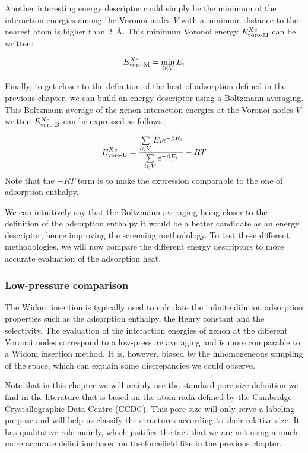 \documentclass[main]{subfiles}
\begin{document}
Another interesting energy descriptor could simply be the minimum of the interaction energies among the Voronoi nodes $V$ with a minimum distance to the nearest atom is higher than \SI{2}{\angstrom}. This minimum Voronoi energy $E_{\text{voro-M}}^{Xe}$ can be written: 

\begin{equation}
    E_{\text{voro-M}}^{Xe} = \min_{i \in V} E_i
\end{equation}

Finally, to get closer to the definition of the heat of adsorption defined in the previous chapter, we can build an energy descriptor using a Boltzmann averaging. This Boltzmann average of the xenon interaction energies at the Voronoi nodes $V$ written $E_{\text{voro-B}}^{Xe}$ can be expressed as follows:

\begin{equation}
    E_{\text{voro-B}}^{Xe} = \dfrac{\sum\limits_{i \in V} E_i e^{-\beta E_i}}{\sum\limits_{i \in V} e^{-\beta E_i}} -RT
\end{equation}
Note that the $-RT$ term is to make the expression comparable to the one of adsorption enthalpy. 

We can intuitively say that the Boltzmann averaging being closer to the definition of the adsorption enthalpy it would be a better candidate as an energy descriptor, hence improving the screening methodology. To test these different methodologies, we will now compare the different energy descriptors to more accurate evaluation of the adsorption heat. 

\subsubsection{Low-pressure comparison}

The Widom insertion is typically used to calculate the infinite dilution adsorption properties such as the adsorption enthalpy, the Henry constant and the selectivity. The evaluation of the interaction energies of xenon at the different Voronoi nodes correspond to a low-pressure averaging and is more comparable to a Widom insertion method. It is, however, biased by the inhomogeneous sampling of the space, which can explain some discrepancies we could observe.

Note that in this chapter we will mainly use the standard pore size definition we find in the literature that is based on the atom radii defined by the Cambridge Crystallographic Data Centre (CCDC). This pore size will only serve a labeling purpose and will help us classify the structures according to their relative size. It has qualitative role mainly, which justifies the fact that we are not using a much more accurate definition based on the forcefield like in the previous chapter. 
\end{document}
